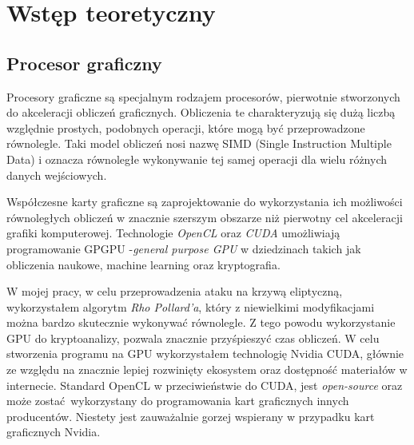 \section{Wstęp teoretyczny}

\subsection{Procesor graficzny}
Procesory graficzne są specjalnym rodzajem procesorów,
pierwotnie stworzonych do akceleracji obliczeń graficznych.
Obliczenia te charakteryzują się dużą liczbą względnie prostych, podobnych operacji,
które mogą być przeprowadzone równolegle.
Taki model obliczeń nosi nazwę SIMD (Single Instruction Multiple Data)
i oznacza równoległe wykonywanie tej samej operacji dla wielu różnych danych wejściowych.
\par
Współczesne karty graficzne są zaprojektowanie do wykorzystania
ich możliwości równoległych obliczeń w znacznie szerszym obszarze niż
pierwotny cel akceleracji grafiki komputerowej.
Technologie \textit{OpenCL} oraz \textit{CUDA} umożliwiają
programowanie GPGPU -\textit{general purpose GPU} w 
dziedzinach takich jak obliczenia naukowe, machine learning oraz kryptografia.
\par
W mojej pracy, w celu przeprowadzenia ataku na krzywą eliptyczną, wykorzystałem
algorytm \textit{Rho Pollard'a}, który z niewielkimi modyfikacjami można bardzo skutecznie wykonywać
równolegle. Z tego powodu wykorzystanie GPU do kryptoanalizy, pozwala znacznie przyśpieszyć czas
obliczeń. W celu stworzenia programu na GPU wykorzystałem technologię Nvidia CUDA, głównie ze względu
na znacznie lepiej rozwinięty ekosystem oraz dostępność materiałów w internecie.
Standard OpenCL w przeciwieństwie do CUDA, jest \textit{open-source} oraz może zostać wykorzystany do programowania
kart graficznych innych producentów. Niestety jest zauważalnie
gorzej wspierany w przypadku kart graficznych Nvidia.
\par

